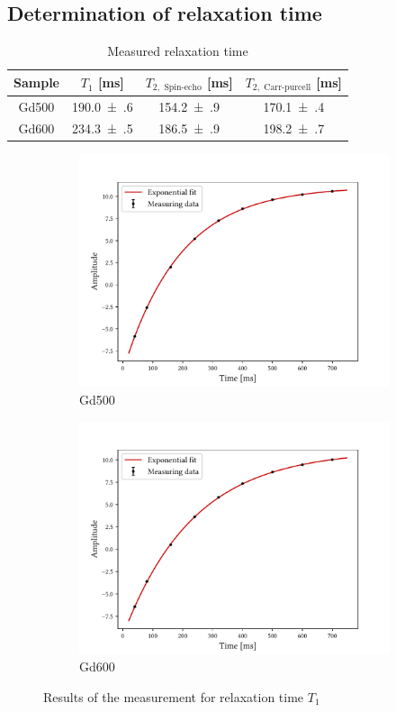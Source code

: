 \subsection{Determination of relaxation time}
\begin{table}[ht]
\centering
\begin{tabular}{cccc}
\toprule
Sample & $T_1$ [ms] & $T_{2,\text{ Spin-echo}}$ [ms] & $T_{2,\text{ Carr-purcell}}$ [ms]\\
\midrule
Gd500 & \num{190.0(6)} & \num{154.2(9)} & \num{170.1(4)}\\
Gd600 & \num{234.3(5)} & \num{186.5(9)} & \num{198.2(7)}\\
\bottomrule
\end{tabular}
\caption{Measured relaxation time}
\label{tab:relax}
\end{table}
\begin{figure}[ht]
\begin{subfigure}{.45\textwidth}
\includegraphics[width=9.3cm]{..//figures//f61_abb_1.pdf}
\caption{Gd500}
\end{subfigure}
\qquad
\begin{subfigure}{.45\textwidth}
\includegraphics[width=9.3cm]{..//figures//f61_abb_1_600.pdf}
\caption{Gd600}
\end{subfigure}
\caption{Results of the measurement for relaxation time $T_1$}
\label{fig:t1}
\end{figure}

